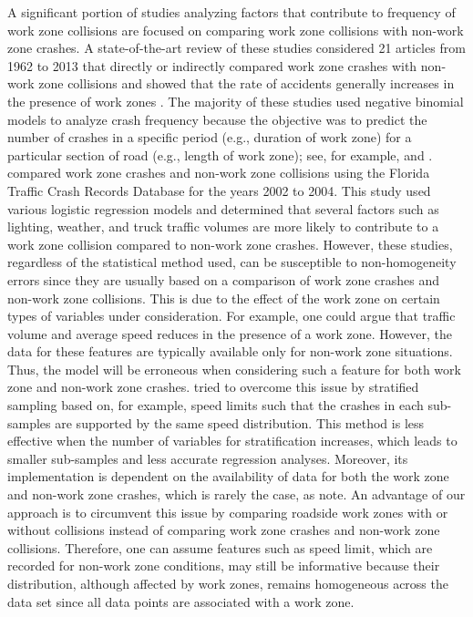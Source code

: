 \documentclass[10pt,a4paper]{article}
\begin{document}
A significant portion of studies analyzing factors that contribute to frequency of work zone collisions are focused on comparing work zone collisions with non-work zone crashes. A state-of-the-art review of these studies considered 21 articles from 1962 to 2013 that directly or indirectly compared work zone crashes with non-work zone collisions and showed that the rate of accidents generally increases in the presence of work zones \citep{yang2015work}. The majority of these studies used negative binomial models to analyze crash frequency because the objective was to predict the number of crashes in a specific period (e.g., duration of work zone) for a particular section of road (e.g., length of work zone); see, for example, \cite{ozturk2013crash} and \cite{yang2013modeling}. \cite{harb2008freeway} compared work zone crashes and non-work zone collisions using the Florida Traffic Crash Records Database for the years 2002 to 2004. This study used various logistic regression models and determined that several factors such as lighting, weather, and truck traffic volumes are more likely to contribute to a work zone collision compared to non-work zone crashes. However, these studies, regardless of the statistical method used, can be susceptible to non-homogeneity errors since they are usually based on a comparison of work zone crashes and non-work zone collisions. This is due to the effect of the work zone on certain types of variables under consideration. For example, one could argue that traffic volume and average speed reduces in the presence of a work zone. However, the data for these features are typically available only for non-work zone situations. Thus, the model will be erroneous when considering such a feature for both work zone and non-work zone crashes. \cite{harb2008freeway} tried to overcome this issue by stratified sampling based on, for example, speed limits such that the crashes in each sub-samples are supported by the same speed distribution. This method is less effective when the number of variables for stratification increases, which leads to smaller sub-samples and less accurate regression analyses. Moreover, its implementation is dependent on the availability of data for both the work zone and non-work zone crashes, which is rarely the case, as \cite{yang2015work} note. An advantage of our approach is to circumvent this issue by comparing roadside work zones with or without collisions instead of comparing work zone crashes and non-work zone collisions. Therefore, one can assume features such as speed limit, which are recorded for non-work zone conditions, may still be informative because their distribution, although affected by work zones, remains homogeneous across the data set since all data points are associated with a work zone.
\end{document}

